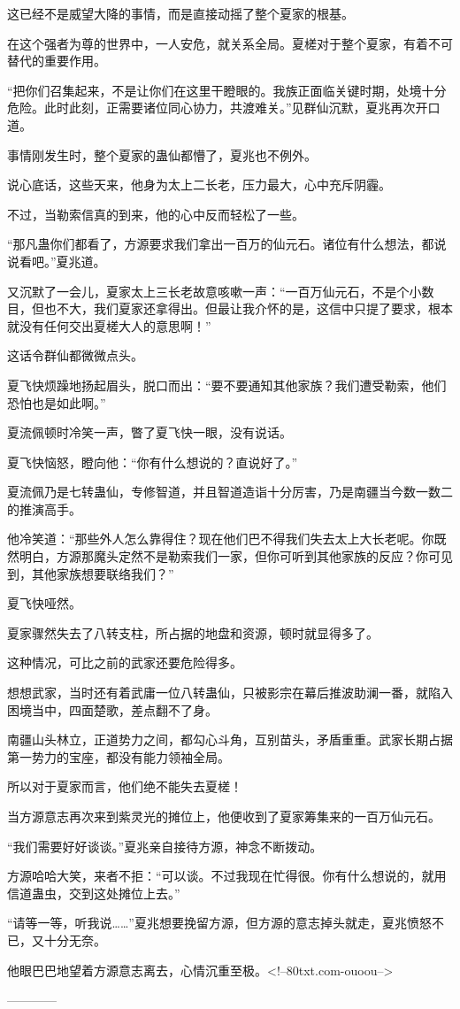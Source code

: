 \begin{this_body}
这已经不是威望大降的事情，而是直接动摇了整个夏家的根基。

在这个强者为尊的世界中，一人安危，就关系全局。夏槎对于整个夏家，有着不可替代的重要作用。

“把你们召集起来，不是让你们在这里干瞪眼的。我族正面临关键时期，处境十分危险。此时此刻，正需要诸位同心协力，共渡难关。”见群仙沉默，夏兆再次开口道。

事情刚发生时，整个夏家的蛊仙都懵了，夏兆也不例外。

说心底话，这些天来，他身为太上二长老，压力最大，心中充斥阴霾。

不过，当勒索信真的到来，他的心中反而轻松了一些。

“那凡蛊你们都看了，方源要求我们拿出一百万的仙元石。诸位有什么想法，都说说看吧。”夏兆道。

又沉默了一会儿，夏家太上三长老故意咳嗽一声：“一百万仙元石，不是个小数目，但也不大，我们夏家还拿得出。但最让我介怀的是，这信中只提了要求，根本就没有任何交出夏槎大人的意思啊！”

这话令群仙都微微点头。

夏飞快烦躁地扬起眉头，脱口而出：“要不要通知其他家族？我们遭受勒索，他们恐怕也是如此啊。”

夏流佩顿时冷笑一声，瞥了夏飞快一眼，没有说话。

夏飞快恼怒，瞪向他：“你有什么想说的？直说好了。”

夏流佩乃是七转蛊仙，专修智道，并且智道造诣十分厉害，乃是南疆当今数一数二的推演高手。

他冷笑道：“那些外人怎么靠得住？现在他们巴不得我们失去太上大长老呢。你既然明白，方源那魔头定然不是勒索我们一家，但你可听到其他家族的反应？你可见到，其他家族想要联络我们？”

夏飞快哑然。

夏家骤然失去了八转支柱，所占据的地盘和资源，顿时就显得多了。

这种情况，可比之前的武家还要危险得多。

想想武家，当时还有着武庸一位八转蛊仙，只被影宗在幕后推波助澜一番，就陷入困境当中，四面楚歌，差点翻不了身。

南疆山头林立，正道势力之间，都勾心斗角，互别苗头，矛盾重重。武家长期占据第一势力的宝座，都没有能力领袖全局。

所以对于夏家而言，他们绝不能失去夏槎！

当方源意志再次来到紫灵光的摊位上，他便收到了夏家筹集来的一百万仙元石。

“我们需要好好谈谈。”夏兆亲自接待方源，神念不断拨动。

方源哈哈大笑，来者不拒：“可以谈。不过我现在忙得很。你有什么想说的，就用信道蛊虫，交到这处摊位上去。”

“请等一等，听我说……”夏兆想要挽留方源，但方源的意志掉头就走，夏兆愤怒不已，又十分无奈。

他眼巴巴地望着方源意志离去，心情沉重至极。<!--80txt.com-ouoou-->

------------

\end{this_body}

